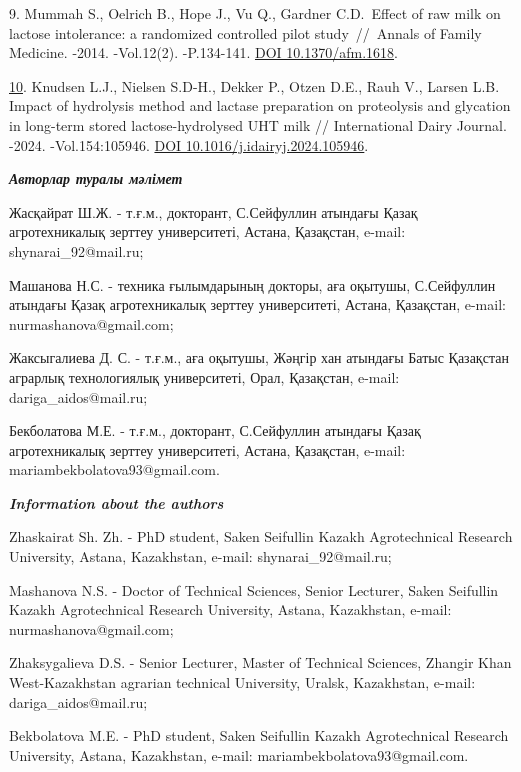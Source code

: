 \begin{refs}
9. Mummah S., Oelrich B., Hope J., Vu Q., Gardner C.D.~Effect of raw
milk on lactose intolerance: a randomized controlled pilot
study~//~Annals of Family Medicine. -2014. -Vol.12(2). -P.134-141.
\href{https://doi.org/10.1370/afm.1618}{DOI 10.1370/afm.1618}.

\href{https://doi.org/10.3390/dairy5030036\%209}{10}. Knudsen L.J.,
Nielsen S.D-H., Dekker P., Otzen D.E., Rauh V., Larsen L.B. Impact of
hydrolysis method and lactase preparation on proteolysis and glycation
in long-term stored lactose-hydrolysed UHT milk // International Dairy
Journal. -2024. -Vol.154:105946.
\href{https://doi.org/10.1016/j.idairyj.2024.105946}{DOI
10.1016/j.idairyj.2024.105946}.
\end{refs}

\begin{info}
\hspace{1em}\emph{{\bfseries Авторлар туралы мәлімет}}

Жасқайрат Ш.Ж. - т.ғ.м., докторант, С.Сейфуллин атындағы Қазақ
агротехникалық зерттеу университеті, Астана, Қазақстан, e-mail:
shynarai\_92@mail.ru;

Машанова Н.С. - техника ғылымдарының докторы, аға оқытушы, С.Сейфуллин
атындағы Қазақ агротехникалық зерттеу университеті, Астана, Қазақстан,
e-mail:
nurmashanova@gmail.com;

Жаксыгалиева Д. С. - т.ғ.м., аға оқытушы, Жәңгір хан атындағы Батыс
Қазақстан аграрлық технологиялық университеті, Орал, Қазақстан, e-mail:
dariga\_aidos@mail.ru;

Бекболатова М.Е. - т.ғ.м., докторант, С.Сейфуллин атындағы Қазақ
агротехникалық зерттеу университеті, Астана, Қазақстан, e-mail:
mariambekbolatova93@gmail.com.

\hspace{1em}\emph{{\bfseries Information about the authors}}

Zhaskairat Sh. Zh. - PhD student, Saken Seifullin Kazakh Agrotechnical
Research University, Astana, Kazakhstan, e-mail:
shynarai\_92@mail.ru;

Mashanova N.S. - Doctor of Technical Sciences, Senior Lecturer, Saken
Seifullin Kazakh Agrotechnical Research University, Astana, Kazakhstan,
e-mail: nurmashanova@gmail.com;

Zhaksygalieva D.S. - Senior Lecturer, Master of Technical Sciences,
Zhangir Khan West-Kazakhstan agrarian technical University, Uralsk,
Kazakhstan, e-mail:
dariga\_aidos@mail.ru;

Bekbolatova M.E. - PhD student, Saken Seifullin Kazakh Agrotechnical
Research University, Astana, Kazakhstan, e-mail:
mariambekbolatova93@gmail.com.
\end{info}

